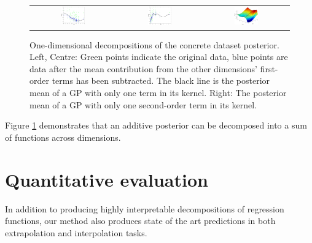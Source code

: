 \documentclass[twoside]{article}
\begin{document}
\begin{figure}[h!]
\centering
\begin{tabular}{ccc}
\includegraphics[width=0.3\textwidth]{../figures/additive_multi_d/interpretable_1st_order1.pdf} &
\includegraphics[width=0.3\textwidth]{../figures/additive_multi_d/interpretable_1st_order2.pdf}& 
\includegraphics[width=0.3\textwidth]{../figures/additive_multi_d/interpretable_2nd_order1.pdf}\\
\end{tabular}
\caption{One-dimensional decompositions of the concrete dataset posterior.  Left, Centre:  Green points indicate the original data, blue points are data after the mean contribution from the other dimensions' first-order terms has been subtracted.  The black line is the posterior mean of a GP with only one term in its kernel.  Right:  The posterior mean of a GP with only one second-order term in its kernel.}
\label{fig:interpretable functions}
\end{figure}
%
Figure \ref{fig:interpretable functions} demonstrates that an additive posterior can be decomposed into a sum of functions across dimensions.


\section{Quantitative evaluation}

In addition to producing highly interpretable decompositions of regression functions, our method also produces state of the art predictions in both extrapolation and interpolation tasks.
\end{document}
